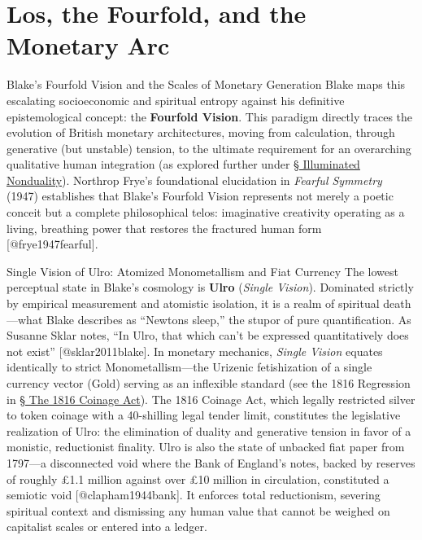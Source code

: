 \documentclass[
  ignorenonframetext,
]{beamer}
\author{\texorpdfstring{}{}}
\date{}
\begin{document}
\section{Los, the Fourfold, and the Monetary
Arc}\label{los-the-fourfold-and-the-monetary-arc}

\begin{frame}{Blake's Fourfold Vision and the Scales of Monetary
Generation}
\protect{}\label{sec-four-levels-vision}
Blake maps this escalating socioeconomic and spiritual entropy against
his definitive epistemological concept: the \textbf{Fourfold Vision}.
This paradigm directly traces the evolution of British monetary
architectures, moving from calculation, through generative (but
unstable) tension, to the ultimate requirement for an overarching
qualitative human integration (as explored further under
\hyperlink{sec-illuminated-nonduality}{§ Illuminated Nonduality}).
Northrop Frye's foundational elucidation in \emph{Fearful Symmetry}
(1947) establishes that Blake's Fourfold Vision represents not merely a
poetic conceit but a complete philosophical telos: imaginative
creativity operating as a living, breathing power that restores the
fractured human form {[}@frye1947fearful{]}.

\begin{block}{Single Vision of Ulro: Atomized Monometallism and Fiat
Currency}
\protect{}\label{single-vision-of-ulro-atomized-monometallism-and-fiat-currency}
The lowest perceptual state in Blake's cosmology is \textbf{Ulro}
(\emph{Single Vision}). Dominated strictly by empirical measurement and
atomistic isolation, it is a realm of spiritual death---what Blake
describes as ``Newtons sleep,'' the stupor of pure quantification. As
Susanne Sklar notes, ``In Ulro, that which can't be expressed
quantitatively does not exist'' {[}@sklar2011blake{]}. In monetary
mechanics, \emph{Single Vision} equates identically to strict
Monometallism---the Urizenic fetishization of a single currency vector
(Gold) serving as an inflexible standard (see the 1816 Regression in
\hyperlink{sec-coinage-act-1816}{§ The 1816 Coinage Act}). The 1816
Coinage Act, which legally restricted silver to token coinage with a
40-shilling legal tender limit, constitutes the legislative realization
of Ulro: the elimination of duality and generative tension in favor of a
monistic, reductionist finality. Ulro is also the state of unbacked fiat
paper from 1797---a disconnected void where the Bank of England's notes,
backed by reserves of roughly £1.1 million against over £10 million in
circulation, constituted a semiotic void {[}@clapham1944bank{]}. It
enforces total reductionism, severing spiritual context and dismissing
any human value that cannot be weighed on capitalist scales or entered
into a ledger.
\end{block}


\end{frame}
\end{document}
